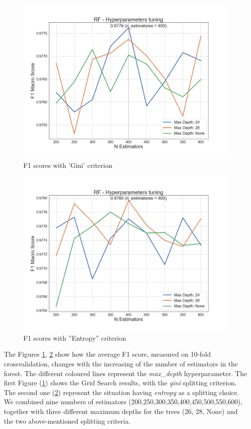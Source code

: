 \begin{figure}[htp!]
	\centering
	\includegraphics[width=\columnwidth]{chapter5/figure/multiclass_rf_tuning_gini.png}
	\caption{F1 scores with 'Gini' criterion}
	\label{fig:rf_tuning_gini}
\end{figure}
\begin{figure}[htp!]
	\centering
	\includegraphics[width=\columnwidth]{chapter5/figure/multiclass_rf_tuning.png}
	\caption{F1 scores with ''Entropy'' criterion}
	\label{fig:rf_tuning_entropy}
\end{figure}

The Figures \ref{fig:rf_tuning_gini}, \ref{fig:rf_tuning_entropy} show how the average F1 score, measured on 10-fold crossvalidation, changes with the increasing of the number of estimators in the forest.
The different coloured lines represent the \textit{max\_depth} hyperparameter.
The first Figure (\ref{fig:rf_tuning_gini}) shows the Grid Search results, with the \textit{gini} splitting criterion.
The second one (\ref{fig:rf_tuning_entropy}) represent the situation having \textit{entropy} as a splitting choice.
We combined nine numbers of estimators (200,250,300,350,400,450,500,550,600), together with three different maximum depths for the trees (26, 28, None) and the two above-mentioned splitting criteria.

